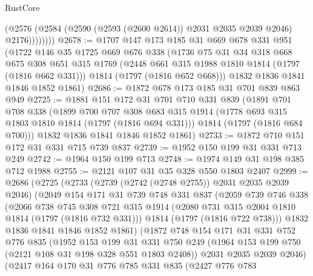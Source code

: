\begin{lexlean}{RustCore}
\begin{coremodule}
                (@2576 (@2584 (@2590 (@2593 (@2600 @2614)) @2031 @2035 @2039 @2046) @2176))))))))
@2678 := @1707
    @147
    @173
    @185
    @31
    @669
    @678
    @331
    @951
    (@1722
      @146
      @35
      @1725
      @669
      @676
      @338
      (@1736
        @75
        @31
        @34
        @318
        @668
        @675
        @308
        @651
        @315
        @1769
        (@2448 @661 @315 @1988 @1810 @1814 (@1797 (@1816 @662 @331)))
        @1814
        (@1797 (@1816 @652 @668)))
      @1832
      @1836
      @1841
      @1846
      @1852
      @1861)
@2686 := @1872 @678 @173 @185 @31 @701 @839 @863 @949
@2725 := @1881
    @151
    @172
    @31
    @701
    @710
    @331
    @839
    (@1891
      @701
      @708
      @338
      (@1899
        @700
        @707
        @308
        @683
        @315
        @1914
        (@1778 @693 @315 @1803 @1810 @1814 (@1797 (@1816 @694 @331)))
        @1814
        (@1797 (@1816 @684 @700)))
      @1832
      @1836
      @1841
      @1846
      @1852
      @1861)
@2733 := @1872 @710 @151 @172 @31 @331 @715 @739 @837
@2739 := @1952 @150 @199 @31 @331 @713 @249
@2742 := @1964 @150 @199 @713
@2748 := @1974 @149 @31 @198 @385 @712 @1988
@2755 := @2121 @107 @31 @35 @328 @550 @1803 @2407
@2999 := @2686
    (@2725
      (@2733
        (@2739 (@2742 (@2748 @2755)) @2031 @2035 @2039 @2046)
        (@2049
          @154
          @171
          @31
          @739
          @748
          @331
          @837
          (@2059
            @739
            @746
            @338
            (@2066
              @738
              @745
              @308
              @721
              @315
              @1914
              (@2080 @731 @315 @2004 @1810 @1814 (@1797 (@1816 @732 @331)))
              @1814
              (@1797 (@1816 @722 @738)))
            @1832
            @1836
            @1841
            @1846
            @1852
            @1861)
          (@1872
            @748
            @154
            @171
            @31
            @331
            @752
            @776
            @835
            (@1952
              @153
              @199
              @31
              @331
              @750
              @249
              (@1964 @153 @199 @750 (@2121 @108 @31 @198 @328 @551 @1803 @2408))
              @2031
              @2035
              @2039
              @2046)
            (@2417
              @164
              @170
              @31
              @776
              @785
              @331
              @835
              (@2427
                @776
                @783

\end{coremodule}
\end{lexlean}
